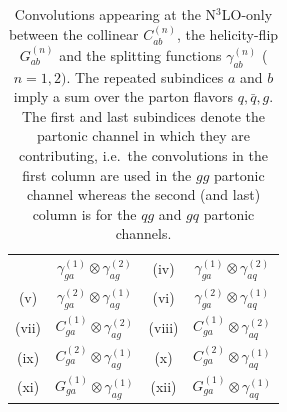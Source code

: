 \documentclass[12pt]{article}
\begin{document}
\begin{appendix}
\begin{table}
\begin{tabular}{ |c|c||c|c| }
& $\gamma^{(1)}_{ga}\otimes\gamma^{(2)}_{ag}$

& \multirow{1}{*}{(iv)} 

& $\gamma^{(1)}_{ga}\otimes\gamma^{(2)}_{aq}$  \\

\multirow{1}{*}{(v)} 

& $\gamma^{(2)}_{ga}\otimes\gamma^{(1)}_{ag}$

& \multirow{1}{*}{(vi)} 

& $\gamma^{(2)}_{ga}\otimes\gamma^{(1)}_{aq}$  \\

\multirow{1}{*}{(vii)} 

& $C^{(1)}_{ga}\otimes\gamma^{(2)}_{ag}$

& \multirow{1}{*}{(viii)} 

& $C^{(1)}_{ga}\otimes\gamma^{(2)}_{aq}$  \\

\multirow{1}{*}{(ix)} 

& $C^{(2)}_{ga}\otimes\gamma^{(1)}_{ag}$

& \multirow{1}{*}{(x)} 

& $C^{(2)}_{ga}\otimes\gamma^{(1)}_{aq}$  \\

\multirow{1}{*}{(xi)} 

& $G^{(1)}_{ga}\otimes\gamma^{(1)}_{ag}$

& \multirow{1}{*}{(xii)} 

& $G^{(1)}_{ga}\otimes\gamma^{(1)}_{aq}$  \\

\hline
\end{tabular}
\caption{\label{Table:convosN3LO}
{Convolutions appearing at the N$^{3}$LO-only between the collinear $C^{(n)}_{ab}$, the helicity-flip $G^{(n)}_{ab}$ and the splitting functions $\gamma^{(n)}_{ab}$ ($n=1,2)$. The repeated subindices $a$ and $b$ imply a sum over the parton flavors $q,\bar{q},g$.  The first and last subindices denote the partonic channel in which they are contributing, i.e.\ the convolutions in the first column are used in the $gg$ partonic channel whereas the second (and last) column is for the $qg$ and $gq$ partonic channels.
}}
\renewcommand{\arraystretch}{1}
\end{table}


\end{appendix}
\end{document}
